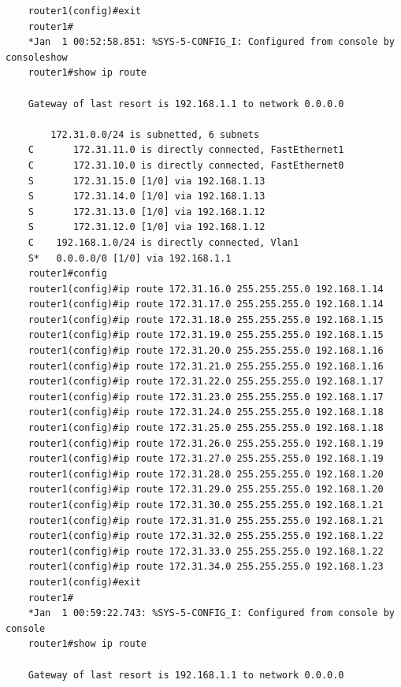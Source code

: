 \documentclass{jlreq}
\begin{document}
    \begin{lstlisting}
    router1(config)#exit
    router1#
    *Jan  1 00:52:58.851: %SYS-5-CONFIG_I: Configured from console by consoleshow
    router1#show ip route
    
    Gateway of last resort is 192.168.1.1 to network 0.0.0.0

        172.31.0.0/24 is subnetted, 6 subnets
    C       172.31.11.0 is directly connected, FastEthernet1
    C       172.31.10.0 is directly connected, FastEthernet0
    S       172.31.15.0 [1/0] via 192.168.1.13
    S       172.31.14.0 [1/0] via 192.168.1.13
    S       172.31.13.0 [1/0] via 192.168.1.12
    S       172.31.12.0 [1/0] via 192.168.1.12
    C    192.168.1.0/24 is directly connected, Vlan1
    S*   0.0.0.0/0 [1/0] via 192.168.1.1
    router1#config
    router1(config)#ip route 172.31.16.0 255.255.255.0 192.168.1.14
    router1(config)#ip route 172.31.17.0 255.255.255.0 192.168.1.14
    router1(config)#ip route 172.31.18.0 255.255.255.0 192.168.1.15
    router1(config)#ip route 172.31.19.0 255.255.255.0 192.168.1.15
    router1(config)#ip route 172.31.20.0 255.255.255.0 192.168.1.16
    router1(config)#ip route 172.31.21.0 255.255.255.0 192.168.1.16
    router1(config)#ip route 172.31.22.0 255.255.255.0 192.168.1.17
    router1(config)#ip route 172.31.23.0 255.255.255.0 192.168.1.17
    router1(config)#ip route 172.31.24.0 255.255.255.0 192.168.1.18
    router1(config)#ip route 172.31.25.0 255.255.255.0 192.168.1.18
    router1(config)#ip route 172.31.26.0 255.255.255.0 192.168.1.19
    router1(config)#ip route 172.31.27.0 255.255.255.0 192.168.1.19
    router1(config)#ip route 172.31.28.0 255.255.255.0 192.168.1.20
    router1(config)#ip route 172.31.29.0 255.255.255.0 192.168.1.20
    router1(config)#ip route 172.31.30.0 255.255.255.0 192.168.1.21
    router1(config)#ip route 172.31.31.0 255.255.255.0 192.168.1.21
    router1(config)#ip route 172.31.32.0 255.255.255.0 192.168.1.22
    router1(config)#ip route 172.31.33.0 255.255.255.0 192.168.1.22
    router1(config)#ip route 172.31.34.0 255.255.255.0 192.168.1.23
    router1(config)#exit
    router1#
    *Jan  1 00:59:22.743: %SYS-5-CONFIG_I: Configured from console by console
    router1#show ip route

    Gateway of last resort is 192.168.1.1 to network 0.0.0.0


\end{lstlisting}
\end{document}
